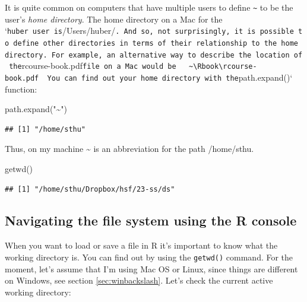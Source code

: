 \documentclass[
  12pt,
  oneside]{book}
\newenvironment{Shaded}{\begin{snugshade}}{\end{snugshade}}
\newcommand{\FunctionTok}[1]{\textcolor[rgb]{0.00,0.00,0.00}{#1}}
\newcommand{\NormalTok}[1]{#1}
\newcommand{\StringTok}[1]{\textcolor[rgb]{0.31,0.60,0.02}{#1}}
\theoremstyle{definition}
\theoremstyle{definition}
\theoremstyle{definition}
\theoremstyle{definition}
\theoremstyle{remark}
\begin{document}
It is quite common on computers that have multiple users to define \texttt{\textasciitilde{}} to be the user's \emph{home directory}. The home directory on a Mac for the `\texttt{huber\textquotesingle{}\textquotesingle{}\ user\ is}/Users/huber/\texttt{.\ And\ so,\ not\ surprisingly,\ it\ is\ possible\ to\ define\ other\ directories\ in\ terms\ of\ their\ relationship\ to\ the\ home\ directory.\ For\ example,\ an\ alternative\ way\ to\ describe\ the\ location\ of\ the}rcourse-book.pdf\texttt{file\ on\ a\ Mac\ would\ be\ \ \textasciigrave{}\textasciigrave{}\textasciigrave{}\ \textasciitilde{}\textbackslash{}Rbook\textbackslash{}rcourse-book.pdf\ \textasciigrave{}\textasciigrave{}\textasciigrave{}\ You\ can\ find\ out\ your\ home\ directory\ with\ the}path.expand()` function:

\begin{Shaded}
\begin{Highlighting}[]
\FunctionTok{path.expand}\NormalTok{(}\StringTok{"\textasciitilde{}"}\NormalTok{)}
\end{Highlighting}
\end{Shaded}

\begin{verbatim}
## [1] "/home/sthu"
\end{verbatim}

Thus, on my machine \textasciitilde{} is an abbreviation for the path /home/sthu.

\begin{Shaded}
\begin{Highlighting}[]
\FunctionTok{getwd}\NormalTok{()}
\end{Highlighting}
\end{Shaded}

\begin{verbatim}
## [1] "/home/sthu/Dropbox/hsf/23-ss/ds"
\end{verbatim}

\hypertarget{sec:navigationR}{%
\subsection{Navigating the file system using the R console}\label{sec:navigationR}}

When you want to load or save a file in R it's important to know what the working directory is. You can find out by using the \texttt{getwd()} command. For the moment, let's assume that I'm using Mac OS or Linux, since things are different on Windows, see section \ref{sec:winbackslash}.
Let's check the current active working directory:
\end{document}
